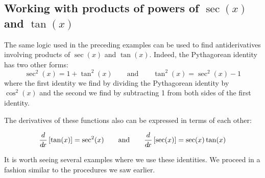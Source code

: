 \documentclass{ximera}
\begin{document}
\subsection{Working with products of powers of $\sec(x)$ and $\tan(x)$}

The same logic used in the preceding examples can be used to find antiderivatives involving products of $\sec(x)$ and $\tan(x)$.  Indeed, the Pythagorean identity has two other forms:
\[
\sec^2(x) = 1 + \tan^2(x)  \qquad\text{and}\qquad \tan^2(x) = \sec^2(x) - 1  
\]
where the first identity we find by dividing the Pythagorean identity by
$\cos^2(x)$ and the second we find by subtracting 1 from both sides of the first identity. 

The derivatives of these functions also can be expressed in terms of each other:

\[
\frac{d}{\mathop{}\!d\! x} \left[\tan(x)\right] = \sec^2(x) \qquad\text{and}\qquad \frac{d}{\mathop{}\!d\! x} \left[\sec(x)\right] = \sec(x)\tan(x)
\]

It is worth seeing several examples where we use these identities. We proceed in a fashion similar to the procedures we saw earlier. 
\end{document}
